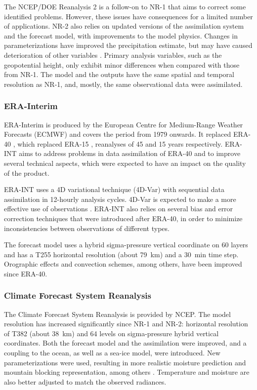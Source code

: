 \documentclass{ametsoc}
\begin{document}
	The NCEP/DOE Reanalysis 2 \citep[NR-2 --][]{Kanamitsu2002} is a follow-on to NR-1 that aims to correct some identified problems. However, these issues have consequences for a limited number of applications. NR-2 also relies on updated versions of the assimilation system and the forecast model, with improvements to the model physics. Changes in parameterizations have improved the precipitation estimate, but may have caused deterioration of other variables \citep{Kistler2001, Kanamitsu2002}. Primary analysis variables, such as the geopotential height, only exhibit minor differences when compared with those from NR-1. The model and the outputs have the same spatial and temporal resolution as NR-1, and, mostly, the same observational data were assimilated.
	
	
	\subsubsection{ERA-Interim}
	
	ERA-Interim \citep[ERA-INT --][]{Dee2011a} is produced by the European Centre for Medium-Range Weather Forecasts (ECMWF) and covers the period from 1979 onwards. It replaced ERA-40 \citep{Uppala2005}, which replaced ERA-15 \citep{Gibson1997}, reanalyses of 45 and 15 years respectively. ERA-INT aims to address problems in data assimilation of ERA-40 and to improve several technical aspects, which were expected to have an impact on the quality of the product.
	
	ERA-INT uses a 4D variational technique (4D-Var) with sequential data assimilation in 12-hourly analysis cycles. 4D-Var is expected to make a more effective use of observations \citep{Dee2011a}. ERA-INT also relies on several bias and error correction techniques that were introduced after ERA-40, in order to minimize inconsistencies between observations of different types.
	
	The forecast model uses a hybrid sigma-pressure vertical coordinate on 60 layers and has a T255 horizontal resolution (about 79~km) and a 30~min time step. Orographic effects and convection schemes, among others, have been improved since ERA-40.
	
	
	\subsubsection{Climate Forecast System Reanalysis}
	
	The Climate Forecast System Reanalysis \citep[CFSR --][]{Saha2010a} is provided by NCEP. The model resolution has increased significantly since NR-1 and NR-2: horizontal resolution of T382 (about 38~km) and 64 levels on sigma-pressure hybrid vertical coordinates. Both the forecast model and the assimilation were improved, and a coupling to the ocean, as well as a sea-ice model, were introduced. New parameterizations were used, resulting in more realistic moisture prediction and mountain blocking representation, among others \citep{Saha2010a}. Temperature and moisture are also better adjusted to match the observed radiances.
	
\end{document}

